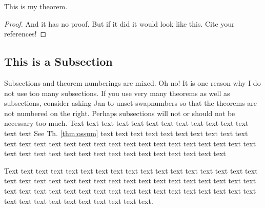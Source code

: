 \begin{thm}[My Theorem]
\label{thm:ossum}
This is my theorem.
\end{thm}
\begin{proof}
And it has no proof. But if it did it would look like this. Cite your references!
\end{proof}

\subsection{This is a Subsection} %
Subsections and theorem numberings are mixed. Oh no! It is one reason why I do not use too many subsections.  If you use very many theorems as well as subsections, consider asking Jan to unset swapnumbers so that the theorems are not numbered on the right. Perhaps subsections will not or should not be necessary too much. Text text text text text text text text text text text text text text See Th. \ref{thm:ossum}
text text text text text text text text text text text text text text
text text text text text text text text text text text text text text
text text text text text text text text text text text text text text

Text text text text text text text text text text text text text text
text text text text text text text text text text text text text text
text text text text text text text text text text text text text text
text text text text text text text text text text text text text text
text text text text text. 